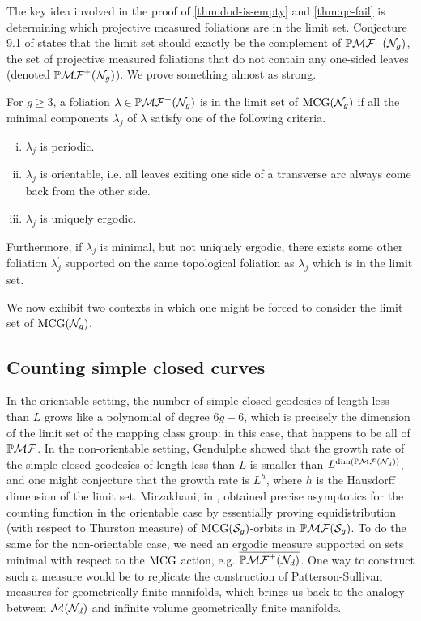 \documentclass[12pt, reqno]{amsart}
\begin{document}
The key idea involved in the proof of \autoref{thm:dod-is-empty} and \autoref{thm:qc-fail} is determining which projective measured foliations are in the limit set.
Conjecture 9.1 of \cite{gendulphe_whats_2017} states that the limit set should exactly be the complement of $\mathbb{P}\mathcal{MF}^-(\mathcal{N}_g)$, the set of projective measured foliations that do not contain any one-sided leaves (denoted $\mathbb{P}\mathcal{MF}^+(\mathcal{N}_g)$).
We prove something almost as strong.
\begingroup
\def\thetheorem{\ref{thm:rational-approximation}}
\begin{theorem}
  For $g \geq 3$, a foliation $\lambda \in \mathbb{P}\mathcal{MF}^+(\mathcal{N}_g)$ is in the limit set of $\mathrm{MCG}(\mathcal{N}_g)$ if all the minimal components $\lambda_j$ of $\lambda$ satisfy one of the following criteria.
  \begin{enumerate}[(i)]
  \item $\lambda_j$ is periodic.
  \item $\lambda_j$ is orientable, i.e. all leaves exiting one side of a transverse arc always come back from the other side.
  \item $\lambda_j$ is uniquely ergodic.
  \end{enumerate}
  Furthermore, if $\lambda_j$ is minimal, but not uniquely ergodic, there exists some other foliation $\lambda_j^{\prime}$ supported on the same topological foliation as $\lambda_j$ which is in the limit set.
\end{theorem}
\addtocounter{theorem}{-1}
\endgroup

We now exhibit two contexts in which one might be forced to consider the limit set of $\mathrm{MCG}(\mathcal{N}_g)$.

\subsection*{Counting simple closed curves}

In the orientable setting, the number of simple closed geodesics of length less than $L$ grows like a polynomial of degree $6g-6$, which is precisely the dimension of the limit set of the mapping class group: in this case, that happens to be all of $\mathbb{P}\mathcal{MF}$.
In the non-orientable setting, Gendulphe showed that the growth rate of the simple closed geodesics of length less than $L$ is smaller than $L^{\dim(\mathbb{P}\mathcal{MF}(\mathcal{N}_g))}$, and one might conjecture that the growth rate is $L^h$, where $h$ is the Hausdorff dimension of the limit set.
Mirzakhani, in \autocite{mirzakhani2008growth}, obtained precise asymptotics for the counting function in the orientable case by essentially proving equidistribution (with respect to Thurston measure) of $\mathrm{MCG}(\mathcal{S}_{g})$-orbits in $\mathbb{P}\mathcal{MF}(\mathcal{S}_g)$.
To do the same for the non-orientable case, we need an ergodic measure supported on sets
minimal with respect to the $\mathrm{MCG}$ action, e.g. $\overline{\mathbb{P}\mathcal{MF}^+(\mathcal{N}_d)}$.
One way to construct such a measure would be to replicate the construction of Patterson-Sullivan measures for geometrically finite manifolds, which brings us back
to the analogy between $\mathcal{M}(\mathcal{N}_d)$ and infinite volume geometrically finite manifolds.
\end{document}
